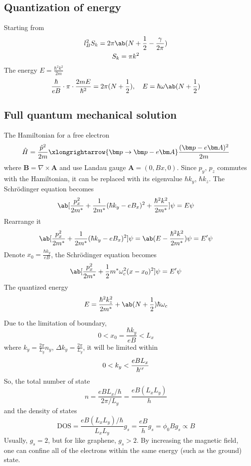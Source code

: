 \subsection{Quantization of energy}

Starting from
\begin{gather}
  l_B^2 S_k = 2\pi \ab(N + \frac12 - \frac\gamma{2\pi})\\
  S_k = \pi k^2
\end{gather}
The energy $E = \frac{\hbar^2k^2}{2m}$
\[
  \frac\hbar{eB} \cdot \pi \cdot \frac{2mE}{\hbar^2} = 2\pi(N + \frac12), \quad
  E = \hbar\omega\ab(N + \frac12)
\]

\subsection{Full quantum mechanical solution}

The Hamiltonian for a free electron
\[
  \hat H = \frac{\hat p^2}{2m} \xlongrightarrow{\bm p\to\bm p - e\bm A}
  \frac{(\bm p - e\bm A)^2}{2m}
\]
where $\bm B = \nabla \times \bm A$ and use Landau gauge $\bm A = (0,Bx,0)$.
Since $p_y$, $p_z$ commutes with the Hamiltonian, it can be replaced with its
eigenvalue $\hbar k_y$, $\hbar k_z$. The Schr\"odinger equation becomes
\[
  \ab[\frac{p_x^2}{2m^*}
    + \frac1{2m^*}(\hbar k_y - eB_x)^2 + \frac{\hbar^2k^2}{2m^*}]\psi
= E\psi
\]
Rearrange it
\[
  \ab[\frac{p_x^2}{2m^*}
    + \frac1{2m^*}(\hbar k_y - eB_x)^2]\psi
= \ab(E - \frac{\hbar^2k^2}{2m^*})\psi = E'\psi
\]
Denote $x_0 = \frac{\hbar k_y}{eB}$, the Schr\"odinger equation becomes
\begin{equation}
  \ab[\frac{p_x^2}{2m^*}
    + \frac12m^*\omega_c^2(x - x_0)^2]\psi = E'\psi
\end{equation}
The quantized energy
\begin{equation}
  E = \frac{\hbar^2k_z^2}{2m^*} + \ab(N + \frac12)\hbar\omega_c
\end{equation}

Due to the limitation of boundary,
\[
  0 < x_0 = \frac{\hbar k_y}{eB} < L_x
\]
where $k_y = \frac{2\pi}{L_y}n_y$, $\Delta k_y = \frac{2\pi}{L_y}$, it will be
limited within
\[
  0 < k_y < \frac{eBL_x}{\hbar`'}
\]
So, the total number of state
\[
  n = \frac{eBL_x/\hbar}{2\pi/L_y} = \frac{eB(L_xL_y)}{h}
\]
and the density of states
\[
  \text{DOS} = \frac{eB(L_xL_y)/\hbar}{L_xL_y}g_s = \frac{eB}{h}g_s
= \phi_0 B g_s \propto B
\]
Usually, $g_s = 2$, but for like graphene, $g_s > 2$.
By increasing the magnetic field, one can confine all of the electrons within
the same energy (such as the ground) state.


